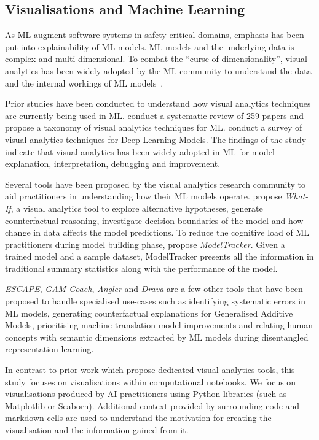 \documentclass[conference]{IEEEtran}
\begin{document}
\subsection{Visualisations and Machine Learning}\label{sec:visualisations}

As ML augment software systems in safety-critical domains, emphasis has been put into explainability of ML models. ML models and the underlying data is complex and multi-dimensional. To combat the ``curse of dimensionality'', visual analytics has been widely adopted by the ML community to understand the data and the internal workings of ML models~\cite{yuan2021survey,hohman2019visual,wexler2020if}.

Prior studies have been conducted to understand how visual analytics techniques are currently being used in ML. \cite{yuan2021survey} conduct a systematic review of 259 papers and propose a taxonomy of visual analytics techniques for ML. \cite{hohman2019visual} conduct a survey of visual analytics techniques for Deep Learning Models. The findings of the study indicate that visual analytics has been widely adopted in ML for model explanation, interpretation, debugging and improvement.

Several tools have been proposed by the visual analytics research community to aid practitioners in understanding how their ML models operate. \cite{wexler2020if} propose \textit{What-If}, a visual analytics tool to explore alternative hypotheses, generate counterfactual reasoning, investigate decision boundaries of the model and how change in data affects the model predictions. To reduce the cognitive load of ML practitioners during model building phase, \cite{amershi2015modeltracker} propose \textit{ModelTracker}. Given a trained model and a sample dataset, ModelTracker presents all the information in traditional summary statistics along with the performance of the model.

\textit{ESCAPE}, \textit{GAM Coach}, \textit{Angler} and \textit{Drava} are a few other tools that have been proposed to handle specialised use-cases such as identifying systematic errors in ML models, generating counterfactual explanations for Generalised Additive Models, prioritising machine translation model improvements and relating human concepts with semantic dimensions extracted by ML models during disentangled representation learning\cite{ahn2023escape, wang2023gam, robertson2023angler, wang2023drava}.

In contrast to prior work which propose dedicated visual analytics tools, this study focuses on visualisations within computational notebooks. We focus on visualisations produced by AI practitioners using Python libraries (such as Matplotlib or Seaborn). Additional context provided by surrounding code and markdown cells are used to understand the motivation for creating the visualisation and the information gained from it.
\end{document}

